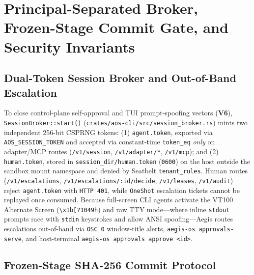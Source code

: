 \documentclass[10pt,journal,compsoc]{IEEEtran}
\begin{document}
\section{Principal-Separated Broker, Frozen-Stage Commit Gate, and Security Invariants}
\label{sec:commit}

\subsection{Dual-Token Session Broker and Out-of-Band Escalation}

To close control-plane self-approval and TUI prompt-spoofing vectors (\textbf{V6}), \texttt{SessionBroker::start()} (\texttt{crates/aos-cli/src/session\_broker.rs}) mints two independent 256-bit CSPRNG tokens: (1) \texttt{agent.token}, exported via \texttt{AOS\_SESSION\_TOKEN} and accepted via constant-time \texttt{token\_eq} \emph{only} on adapter/MCP routes (\texttt{/v1/session}, \texttt{/v1/adapter/*}, \texttt{/v1/mcp}); and (2) \texttt{human.token}, stored in \texttt{session\_dir/\allowbreak human.token} (\texttt{0600}) on the host outside the sandbox mount namespace and denied by Seatbelt \texttt{tenant\_rules}. Human routes (\texttt{/v1/escalations}, \texttt{/v1/\allowbreak escalations/\allowbreak :id/\allowbreak decide}, \texttt{/v1/leases}, \texttt{/v1/audit}) reject \texttt{agent.token} with \texttt{HTTP 401}, while \texttt{OneShot} escalation tickets cannot be replayed once consumed. Because full-screen CLI agents activate the VT100 Alternate Screen (\texttt{\textbackslash x1b[?1049h}) and raw TTY mode---where inline \texttt{stdout} prompts race with \texttt{stdin} keystrokes and allow ANSI spoofing---Aegis routes escalations out-of-band via \texttt{OSC 0} window-title alerts, \texttt{aegis-os approvals-serve}, and host-terminal \texttt{aegis-os approvals approve <id>}.

\subsection{Frozen-Stage SHA-256 Commit Protocol}
\end{document}
